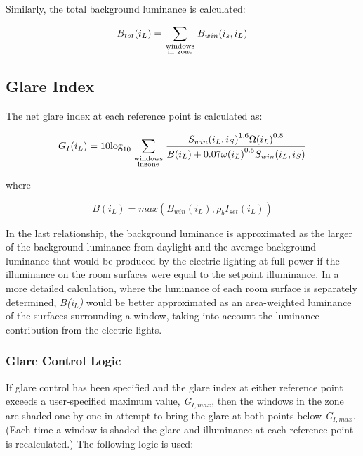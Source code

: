 Similarly, the total background luminance is calculated:

\begin{equation}
{B_{tot}}({i_L}) = \sum\limits_{\scriptstyle{\rm{windows}}\atop\scriptstyle{\rm{in~zone}}} {{B_{win}}({i_s},{i_L})}
\end{equation}

\subsection{Glare Index}\label{glare-index-000}

The net glare index at each reference point is calculated as:

\begin{equation}
{G_I}({i_L}) = 10{\log_{10}}\sum\limits_{\scriptstyle{\rm{windows}}\atop\scriptstyle{\rm{in zone}}} {\frac{{{S_{win}}{{({i_L},{i_S})}^{1.6}}\Omega {{({i_L})}^{0.8}}}}{{B({i_L}) + 0.07\omega {{({i_L})}^{0.5}}{S_{win}}({i_L},{i_S})}}}
\end{equation}

where

\begin{equation}
B\left( {{i_L}} \right) = max\left( {{B_{win}}\left( {{i_L}} \right),{\rho_b}{I_{set}}\left( {{i_L}} \right)} \right)
\end{equation}

In the last relationship, the background luminance is approximated as the larger of the background luminance from daylight and the average background luminance that would be produced by the electric lighting at full power if the illuminance on the room surfaces were equal to the setpoint illuminance. In a more detailed calculation, where the luminance of each room surface is separately determined, \emph{B(i\(_{L}\))} would be better approximated as an area-weighted luminance of the surfaces surrounding a window, taking into account the luminance contribution from the electric lights.

\subsubsection{Glare Control Logic}\label{glare-control-logic}

If glare control has been specified and the glare index at either reference point exceeds a user-specified maximum value, \emph{G\(_{I,max}\)}, then the windows in the zone are shaded one by one in attempt to bring the glare at both points below \emph{G\(_{I,max}\)}. (Each time a window is shaded the glare and illuminance at each reference point is recalculated.) The following logic is used:

